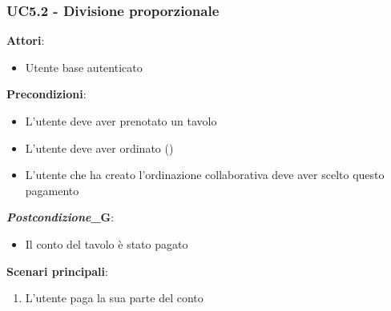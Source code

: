 \subsubsection{UC5.2 - Divisione proporzionale}\label{usecase:5.2}
\textbf{Attori}:
\begin{itemize}
    \item Utente base autenticato
\end{itemize}
\textbf{Precondizioni}:
\begin{itemize}
    \item L'utente deve aver prenotato un tavolo
    \item L'utente deve aver ordinato ()
    \item L'utente che ha creato l'ordinazione collaborativa deve aver scelto questo pagamento
\end{itemize}
\textbf{\textit{Postcondizione}_G}:
\begin{itemize}
    \item Il conto del tavolo è stato pagato
\end{itemize}
\textbf{Scenari principali}:
\begin{enumerate}
    \item L'utente paga la sua parte del conto
\end{enumerate}